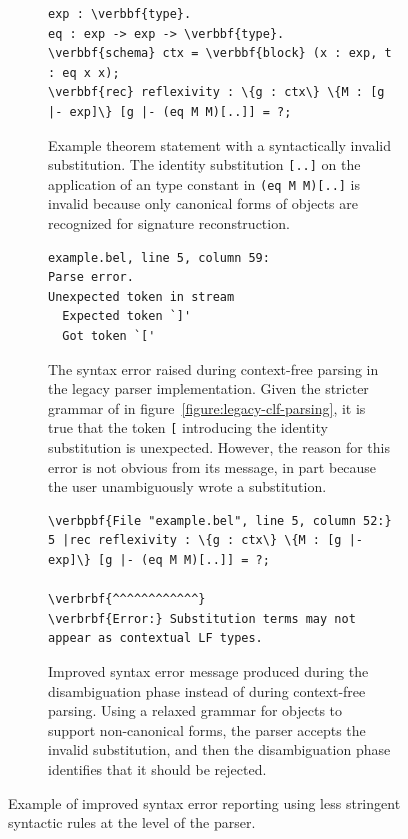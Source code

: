 \begin{figure}[H]
\begin{subfigure}{\linewidth}
\begin{Verbatim}[commandchars=\\\{\}, baselinestretch=1]
exp : \verbbf{type}.
eq : exp -> exp -> \verbbf{type}.
\verbbf{schema} ctx = \verbbf{block} (x : exp, t : eq x x);
\verbbf{rec} reflexivity : \{g : ctx\} \{M : [g |- exp]\} [g |- (eq M M)[..]] = ?;
\end{Verbatim}
\caption{%
Example \Beluga theorem statement with a syntactically invalid substitution.
The identity substitution \texttt{[..]} on the application of an \LF type constant in \texttt{(eq M M)[..]} is invalid because only canonical forms of \LF objects are recognized for signature reconstruction.
}
\end{subfigure}
\par\bigskip
\begin{subfigure}{\linewidth}
\begin{Verbatim}[baselinestretch=1]
example.bel, line 5, column 59:
Parse error.
Unexpected token in stream
  Expected token `]'
  Got token `['
\end{Verbatim}
\caption{%
The syntax error raised during context-free parsing in the legacy parser implementation.
Given the stricter grammar of  in figure~\ref{figure:legacy-clf-parsing}, it is true that the token \texttt{[} introducing the identity substitution is unexpected.
However, the reason for this error is not obvious from its message, in part because the user unambiguously wrote a substitution.
}
\end{subfigure}
\par\bigskip
\begin{subfigure}{\linewidth}
\begin{Verbatim}[commandchars=\\\{\}, baselinestretch=1]
\verbpbf{File "example.bel", line 5, column 52:}
5 |rec reflexivity : \{g : ctx\} \{M : [g |- exp]\} [g |- (eq M M)[..]] = ?;
                                                      \verbrbf{^^^^^^^^^^^^}
\verbrbf{Error:} Substitution terms may not appear as contextual LF types.
\end{Verbatim}
\caption{%
Improved syntax error message produced during the disambiguation phase instead of during context-free parsing.
Using a relaxed grammar for \LF objects to support non-canonical forms, the parser accepts the invalid substitution, and then the disambiguation phase identifies that it should be rejected.
}
\end{subfigure}
\caption[Example of improved syntax error reporting]{%
Example of improved syntax error reporting using less stringent syntactic rules at the level of the parser.
}
\label{figure:improved-syntax-error-message}
\end{figure}

